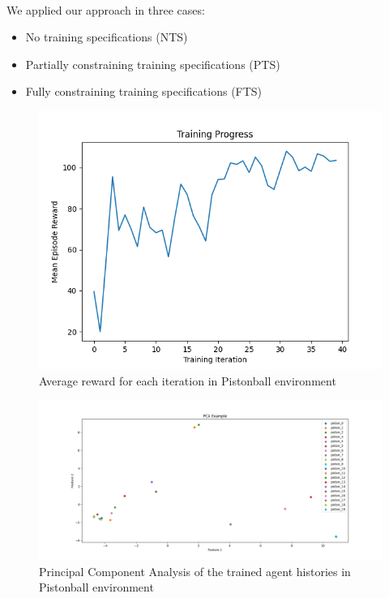 \documentclass[runningheads]{llncs}
\begin{document}
\

\noindent We applied our approach in three cases:
\begin{itemize}
    \item No training specifications (NTS)
    \item Partially constraining training specifications (PTS)
    \item Fully constraining training specifications (FTS)
\end{itemize}

\begin{figure}[h!]
    \centering
    \includegraphics[width=\textwidth]{figures/prahom_learning_curve.png}
    \caption{Average reward for each iteration in Pistonball environment}
    \label{fig:prahom_learning_curve}
\end{figure}

\begin{figure}[h!]
    \centering
    \includegraphics[width=\textwidth]{figures/prahom_pca_analysis.png}
    \caption{Principal Component Analysis of the trained agent histories in Pistonball environment}
    \label{fig:prahom_pca_analysis}
\end{figure}
\end{document}
